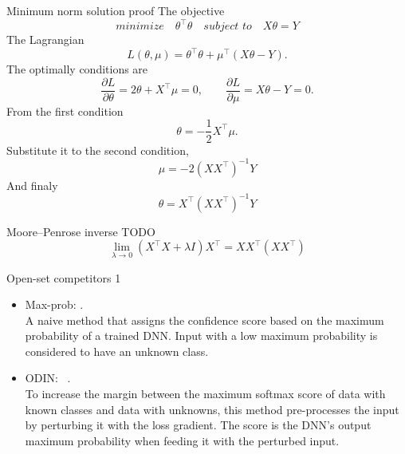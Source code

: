 \documentclass[aspectratio=169]{beamer}
\begin{document}
\begin{frame}{Minimum norm solution proof}
The objective
\begin{equation}
\textit{minimize} \quad \theta^\top \theta \quad \textit{subject to} \quad X \theta = Y
\end{equation}
The Lagrangian
\begin{equation}
L(\theta,\mu)= \theta^\top \theta + \mu^\top \left(X \theta - Y\right).
\end{equation}
The optimally conditions are
\begin{equation}
\frac{\partial L}{\partial \theta} = 2 \theta  + X^\top \mu = 0,
\qquad
\frac{\partial L}{\partial \mu} = X \theta - Y =0.
\end{equation}
From the first condition
\begin{equation}
\theta = - \frac{1}{2} X^\top \mu.
\end{equation}
Substitute it to the second condition,
\begin{equation}
\mu = - 2 \left(X X^\top \right)^{-1} Y
\end{equation}
And finaly
\begin{equation}
\theta = X^\top \left(X X^\top \right)^{-1} Y
\end{equation}
\end{frame}

\begin{frame}{Moore–Penrose inverse TODO}
\begin{equation}
\lim_{\lambda \xrightarrow{} 0 }\left(X^\top X  + \lambda I \right)X^\top = X X^\top\left(X X^\top\right)
\end{equation}
\end{frame}

\begin{frame}{Open-set competitors 1}
\begin{itemize}
\item 
Max-prob: . \\
A naive method that assigns the confidence score based on the maximum probability of a trained DNN.
Input with a low maximum probability is considered to have an unknown class.
\item 
ODIN: ~. \\
To increase the margin between the maximum softmax score of data with known classes and data with unknowns, this method pre-processes the input by perturbing it with the loss gradient.
The score is the DNN's output maximum probability when feeding it with the perturbed input.
\end{itemize}
\end{frame}
\end{document}
